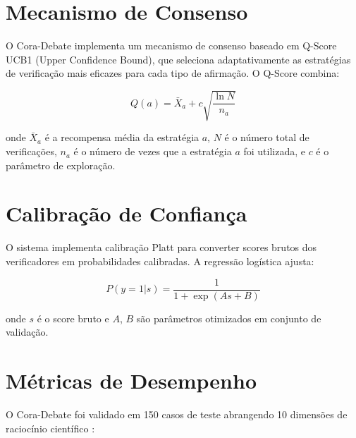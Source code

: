 \documentclass[12pt,a4paper,sumario=tradicional]{abntex2}
\begin{document}
\section{Mecanismo de Consenso}

O Cora-Debate implementa um mecanismo de consenso baseado em Q-Score UCB1 (Upper Confidence Bound), que seleciona adaptativamente as estratégias de verificação mais eficazes para cada tipo de afirmação. O Q-Score combina:

\begin{equation}
    Q(a) = \bar{X}_a + c \sqrt{\frac{\ln N}{n_a}}
\end{equation}

onde $\bar{X}_a$ é a recompensa média da estratégia $a$, $N$ é o número total de verificações, $n_a$ é o número de vezes que a estratégia $a$ foi utilizada, e $c$ é o parâmetro de exploração.

\section{Calibração de Confiança}

O sistema implementa calibração Platt para converter scores brutos dos verificadores em probabilidades calibradas. A regressão logística ajusta:

\begin{equation}
    P(y=1|s) = \frac{1}{1 + \exp(As + B)}
\end{equation}

onde $s$ é o score bruto e $A$, $B$ são parâmetros otimizados em conjunto de validação.

\section{Métricas de Desempenho}

O Cora-Debate foi validado em 150 casos de teste abrangendo 10 dimensões de raciocínio científico \cite{antero2024harnessing}:
\end{document}
